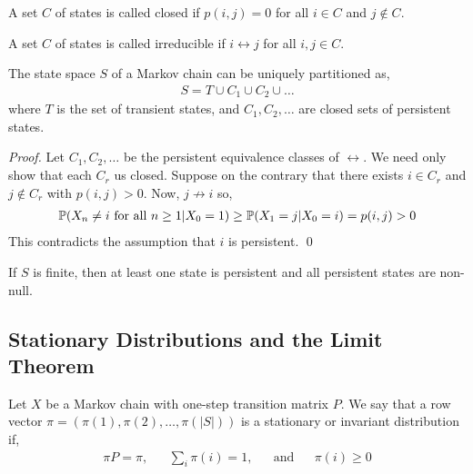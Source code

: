 \documentclass[12pt]{article}
\begin{document}
\begin{definition}[Closed]
A set \( C \) of states is called closed if \( p(i,j) = 0 \) for all \( i\in C \) and \( j\notin C \).
\end{definition}

\begin{definition}[Irreducible]
A set \( C \) of states is called irreducible if \( i\leftrightarrow j \) for all \( i,j\in C  \).
\end{definition}

\begin{theorem}
The state space \( S \) of a Markov chain can be uniquely partitioned as,
\begin{align*}
    S = T \cup C_1 \cup C_2\cup \ldots
\end{align*}
where \( T \) is the set of transient states, and \( C_1, C_2, \ldots \) are closed sets of persistent states.
\end{theorem}

\begin{proof}
Let \( C_1, C_2, \ldots \) be the persistent equivalence classes of \( \leftrightarrow \). We need only show that each \( C_r \) us closed. Suppose on the contrary that there exists \( i\in C_r \) and \( j\notin C_r \) with \( p(i,j) > 0 \). Now, \( j\not\to i \) so,
\begin{align*}
    \mathbb{P}(X_n\neq i \text{ for all }n\geq1 | X_0 = 1)
    \geq \mathbb{P}(X_1 = j | X_0 = i)
    = p(i,j) > 0
\end{align*}
This contradicts the assumption that \( i \) is persistent. \qed
\end{proof}

\begin{lemma}
If \( S \) is finite, then at least one state is persistent and all persistent states are non-null.
\end{lemma}


\subsection{Stationary Distributions and the Limit Theorem}

\begin{definition}
Let \( X \) be a Markov chain with one-step transition matrix \( P \). We say that a row vector \( \pi = (\pi(1),\pi(2), \ldots, \pi(|S|)) \) is a stationary or invariant distribution if,
\begin{align*}
    \pi P = \pi,  && \sum_i \pi(i) = 1, && \text{and} && \pi(i) \geq 0
\end{align*}
\end{definition}
\end{document}

